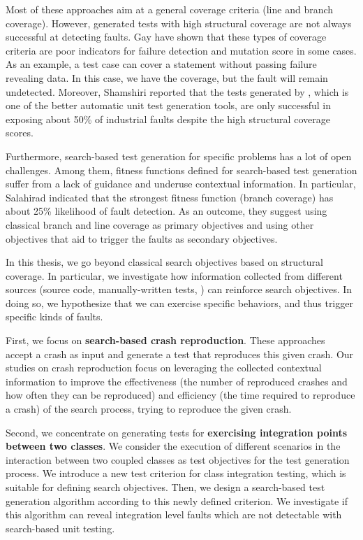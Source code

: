 Most of these approaches aim at a general coverage criteria (\eg line and branch coverage). However,  generated tests with high structural coverage are not always successful at detecting faults. Gay \etal \cite{gay2015risks} have shown that these types of coverage criteria are poor indicators for failure detection and mutation score in some cases. As an example, a test case can cover a statement without passing failure revealing data. In this case, we have the coverage, but the fault will remain undetected.
Moreover, Shamshiri \etal \cite{Shamshiri2016} reported that the tests generated by \evosuite, which is one of the better automatic unit test generation tools, are only successful in exposing about 50\% of industrial faults despite the high structural coverage scores. 

Furthermore, search-based test generation for specific problems has a lot of open challenges. Among them, fitness functions defined for search-based test generation suffer from a lack of guidance and underuse contextual information.  
In particular, Salahirad \etal \cite{Salahirad2019} indicated that the strongest fitness function (branch coverage) has about 25\% likelihood of fault detection.
As an outcome, they suggest using classical branch and line coverage as primary objectives and using other objectives that aid to trigger the faults as secondary objectives.

In this thesis, we go beyond classical search objectives based on structural coverage. In particular, we investigate how information collected from different sources (\ie source code, manually-written tests, \etc) can reinforce search objectives. In doing so, we hypothesize that we can exercise specific behaviors, and thus trigger specific kinds of faults.


First, we focus on \textbf{search-based crash reproduction}. These approaches~\cite{Soltani2018a, BPT17concrash, Chen2015, Nayrolles2017, Rossler2013, Xuan2015} accept a crash as input and generate a test that reproduces this given crash. Our studies on crash reproduction focus on leveraging the collected contextual information to improve the effectiveness (\ie the number of reproduced crashes and how often they can be reproduced) and efficiency (\ie the time required to reproduce a crash) of the search process, trying to reproduce the given crash.

Second, we concentrate on generating tests for \textbf{exercising integration points between two classes}. We consider the execution of different scenarios in the interaction between two coupled classes as test objectives for the test generation process. We introduce a new test criterion for class integration testing, which is suitable for defining search objectives. Then, we design a search-based test generation algorithm according to this newly defined criterion. We investigate if this algorithm can reveal integration level faults which are not detectable with search-based unit testing.

